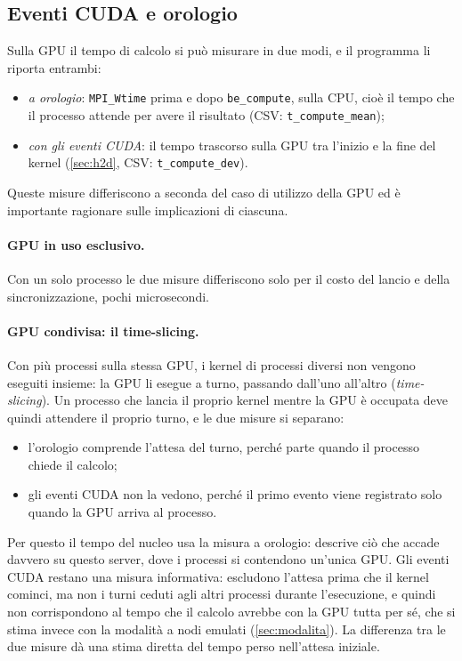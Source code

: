 \documentclass[11pt,a4paper]{article}
\begin{document}
\subsection{Eventi CUDA e orologio}\label{sec:eventi-orologio}

Sulla GPU il tempo di calcolo si può misurare in due modi, e il programma li
riporta entrambi:
\begin{itemize}
  \item \emph{a orologio}: \texttt{MPI\_Wtime} prima e dopo
        \texttt{be\_compute}, sulla CPU, cioè il tempo che il processo attende per
        avere il risultato (CSV: \texttt{t\_compute\_mean});
  \item \emph{con gli eventi CUDA}: il tempo trascorso sulla GPU tra l'inizio e
        la fine del kernel (\cref{sec:h2d}, CSV: \texttt{t\_compute\_dev}).
\end{itemize}
Queste misure differiscono a seconda del caso di utilizzo della GPU ed è importante ragionare sulle implicazioni di ciascuna.

\paragraph{GPU in uso esclusivo.} Con un solo processo le due misure
differiscono solo per il costo del lancio e della sincronizzazione, pochi
microsecondi.

\paragraph{GPU condivisa: il time-slicing.} Con più processi sulla stessa GPU, i
kernel di processi diversi non vengono eseguiti insieme: la GPU li esegue a
turno, passando dall'uno all'altro (\emph{time-slicing}). Un processo che lancia
il proprio kernel mentre la GPU è occupata deve quindi attendere il proprio
turno, e le due misure si separano:
\begin{itemize}
  \item l'orologio comprende l'attesa del turno, perché parte quando il
        processo chiede il calcolo;
  \item gli eventi CUDA non la vedono, perché il primo evento viene registrato
        solo quando la GPU arriva al processo.
\end{itemize}

Per questo il tempo del nucleo usa la misura a orologio: descrive ciò che
accade davvero su questo server, dove i processi si contendono un'unica GPU.
Gli eventi CUDA restano una misura informativa: escludono l'attesa prima che
il kernel cominci, ma non i turni ceduti agli altri processi durante
l'esecuzione, e quindi non corrispondono al tempo che il calcolo avrebbe con la
GPU tutta per sé, che si stima invece con la modalità a nodi emulati
(\cref{sec:modalita}). La differenza tra le due misure dà una stima diretta del
tempo perso nell'attesa iniziale.
\end{document}
